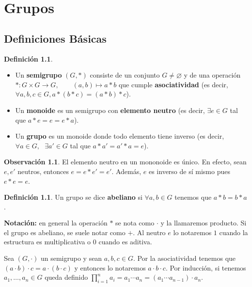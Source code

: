 \documentclass[12pt]{book}
\theoremstyle{definition}
\newtheorem{obs}[teo]{Observación}
\newtheorem{defn}[teo]{Definición}
\let\emptyset\varnothing
\begin{document}
\clearpage\tableofcontents\newpage{}

\chapter{Grupos}

\section{Definiciones Básicas}

\begin{defn} \begin{itemize}
\item Un \textbf{semigrupo} $(G,*)$ consiste de un conjunto $G\neq \emptyset$ y de una operación $* :G\times G\to G, \qquad (a,b)\mapsto a*b$ que cumple \textbf{asociatividad} (es decir, $\forall a,b,c\in G, a*(b* c) = (a* b)* c$).
\item Un \textbf{monoide} es un semigrupo con \textbf{elemento neutro} (es decir, $\exists e \in G$ tal que $a* e = e = e*a$).
\item Un \textbf{grupo} es un monoide donde todo elemento tiene inverso (es decir, $\forall a\in G, \text{ } \exists a'\in G$ tal que $a* a' = a' * a = e$).
\end{itemize}
\end{defn}

\begin{obs}
El elemento neutro en un mononoide es único. En efecto, sean $e,e'$ neutros, entonces $e = e * e' = e'$. Además, $e$ es inverso de sí mismo pues $e*e = e$.
\end{obs}

\begin{defn}
Un grupo se dice \textbf{abeliano} si $\forall a,b\in G$ tenemos que $a* b = b* a$.
\end{defn}

\textbf{Notación:} en general la operación $*$ se nota como $\cdot$ y la llamaremos producto. Si el grupo es abeliano, se suele notar como $+$. Al neutro $e$ lo notaremos $1$ cuando la estructura es multiplicativa o $0$ cuando es aditiva.

Sea $(G,\cdot)$ un semigrupo y sean $a,b,c\in G$. Por la asociatividad tenemos que $(a\cdot b)\cdot c = a \cdot (b\cdot c)$ y entonces lo notaremos $a\cdot b\cdot c$. Por inducción, si tenemos $a_1,\ldots , a_n\in G$ queda definido $\prod_{i=1}^{n}a_i = a_1\cdots a_n = (a_1\cdots a_{n-1})\cdot a_n$.
\end{document}
